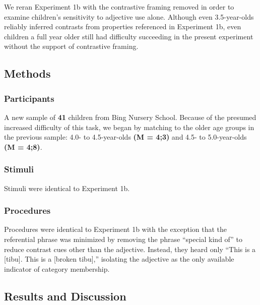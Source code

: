 \documentclass[10pt,letterpaper]{article}
\begin{document}
We reran Experiment 1b with the contrastive framing removed in order to examine children's sensitivity to adjective use alone. Although even 3.5-year-olds reliably inferred contrasts from properties referenced in Experiment 1b, even children a full year older still had difficulty succeeding in the present experiment without the support of contrastive framing.  

\subsection{Methods}

\subsubsection{Participants}

A new sample of \textbf{41} children from Bing Nursery School.  Because of the presumed increased difficulty of this task, we began by matching to the older age groups in the previous sample: 4.0- to 4.5-year-olds \textbf{(M = 4;3)} and 4.5- to 5.0-year-olds \textbf{(M = 4;8)}.

\subsubsection{Stimuli}

Stimuli were identical to Experiment 1b. 

\subsubsection{Procedures}

Procedures were identical to Experiment 1b with the exception that the referential phrase was minimized by removing the phrase ``special kind of'' to reduce contrast cues other than the adjective.  Instead, they heard only ``This is a [tibu]. This is a [broken tibu],'' isolating the adjective as the only available indicator of category membership.

\subsection{Results and Discussion}
\end{document}
